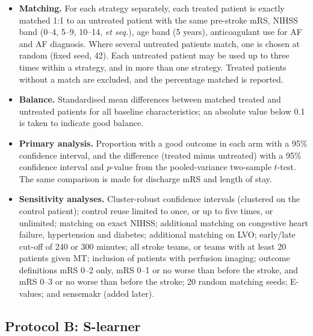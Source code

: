 \begin{itemize}
\item \textbf{Matching.} For each strategy separately, each treated patient is exactly matched 1:1 to an untreated patient with the same pre-stroke mRS, NIHSS band (0--4, 5--9, 10--14, \textit{et seq.}), age band (5 years), anticoagulant use for AF and AF diagnosis. Where several untreated patients match, one is chosen at random (fixed seed, 42). Each untreated patient may be used up to three times within a strategy, and in more than one strategy. Treated patients without a match are excluded, and the percentage matched is reported.
\item \textbf{Balance.} Standardised mean differences between matched treated and untreated patients for all baseline characteristics; an absolute value below 0.1 is taken to indicate good balance.
\item \textbf{Primary analysis.} Proportion with a good outcome in each arm with a 95\% confidence interval, and the difference (treated minus untreated) with a 95\% confidence interval and $p$-value from the pooled-variance two-sample $t$-test. The same comparison is made for discharge mRS and length of stay.
\item \textbf{Sensitivity analyses.} Cluster-robust confidence intervals (clustered on the control patient); control reuse limited to once, or up to five times, or unlimited; matching on exact NIHSS; additional matching on congestive heart failure, hypertension and diabetes; additional matching on LVO; early/late cut-off of 240 or 300 minutes; all stroke teams, or teams with at least 20 patients given MT; inclusion of patients with perfusion imaging; outcome definitions mRS 0--2 only, mRS 0--1 or no worse than before the stroke, and mRS 0--3 or no worse than before the stroke; 20 random matching seeds; E-values; and sensemakr (added later).
\end{itemize}

\subsection{Protocol B: S-learner}\label{sec:protocol_sl}

